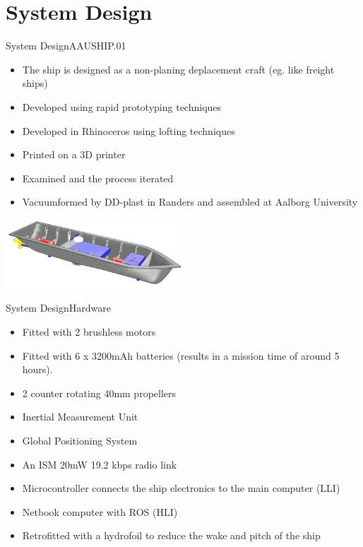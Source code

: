 \documentclass[10pt,handout]{beamer}
\begin{document}
\section{System Design}
\begin{frame}{System Design}{AAUSHIP.01}
\begin{itemize}
  \item The ship is designed as a non-planing deplacement craft (eg. like freight ships)
  \item Developed using rapid prototyping techniques
  \item Developed in Rhinoceros using lofting techniques
  \item Printed on a 3D printer
  \item Examined and the process iterated
  \item Vacuumformed by DD-plast in Randers and assembled at Aalborg University
\end{itemize}
\begin{center}
\includegraphics[width=0.5\textwidth]{img/blender-render}
\end{center}
\end{frame}

\begin{frame}{System Design}{Hardware}
\begin{itemize}
  \item Fitted with 2 brushless motors
  \item Fitted with 6 x 3200mAh batteries (results in a mission time of around 5 hours).
  \item 2 counter rotating 40mm propellers
  \item Inertial Measurement Unit
  \item Global Positioning System
  \item An ISM 20mW 19.2 kbps radio link 
  \item Microcontroller connects the ship electronics to the main computer (LLI)
  \item Netbook computer with ROS (HLI)
  \item Retrofitted with a hydrofoil to reduce the wake and pitch of the ship
\end{itemize}
\end{frame}
\end{document}
